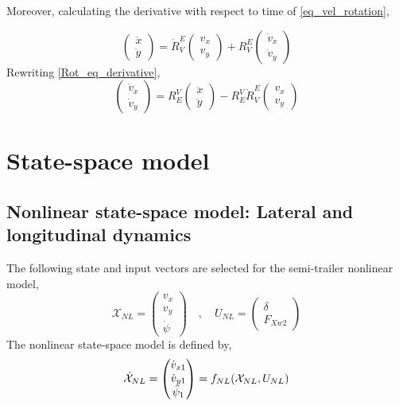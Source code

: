 \documentclass[12pt]{article}
\begin{document}
Moreover, calculating the derivative with respect to time of \eqref{eq_vel_rotation},

\begin{equation}\label{Rot_eq_derivative}
    \begin{pmatrix} \ddot{x} \\ \ddot{y} \end{pmatrix} = \dot{R}^E_{V} \begin{pmatrix} v_{x} \\ v_{y} \end{pmatrix} + R^E_{V} \begin{pmatrix} \dot{v}_{x} \\ \dot{v}_{y} \end{pmatrix}
\end{equation}
Rewriting \eqref{Rot_eq_derivative},
\begin{equation}\label{velocity_fixed_unit_1_eq}
    \begin{pmatrix} \dot{v}_{x} \\ \dot{v}_{y} \end{pmatrix} = R^V_{E}  \begin{pmatrix} \ddot{x} \\ \ddot{y} \end{pmatrix} - R^V_{E} \dot{R}^E_{V} \begin{pmatrix} v_{x} \\ v_{y} \end{pmatrix} 
\end{equation}

\section{State-space model}

\subsection{Nonlinear state-space model: Lateral and longitudinal dynamics}
The following state and input vectors are selected for the semi-trailer nonlinear model,
\begin{equation}\label{NL_states_input}
    \mathcal{X}_{NL} = \begin{pmatrix} v_{x} \\ v_{y} \\ \Dot{\psi} \end{pmatrix} \quad , \quad U_{NL} = \begin{pmatrix} \delta \\ F_{Xw2} \end{pmatrix}
\end{equation}
The nonlinear state-space model is defined by,
\begin{equation}
	\label{Nonlinear_state_space_eq}
    \Dot{\mathcal{X}}_{NL} = \begin{pmatrix} \Dot{v}_{x1}  \\ \Dot{v}_{y1} \\ \Ddot{\psi}_1 \end{pmatrix} = f_{NL}(\mathcal{X}_{NL},U_{NL})
\end{equation}
\end{document}
